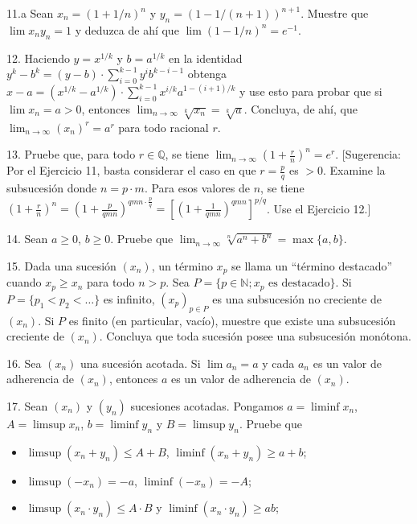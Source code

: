 \documentclass[12pt,oneside]{book}
\begin{document}
11.a Sean \( x_n = (1 + 1/n)^n \) y \( y_n = (1 - 1/(n+1))^{n+1} \). Muestre que \( \lim x_n y_n = 1 \) y deduzca de ahí que \( \lim (1 - 1/n)^n = e^{-1} \).

12. Haciendo \( y = x^{1/k} \) y \( b = a^{1/k} \) en la identidad \( y^k - b^k = (y - b) \cdot \sum_{i=0}^{k-1} y^i b^{k-i-1} \) obtenga \( x - a = (x^{1/k} - a^{1/k}) \cdot \sum_{i=0}^{k-1} x^{i/k} a^{1-(i+1)/k} \) y use esto para probar que si \( \lim x_n = a > 0 \), entonces \( \lim_{n \to \infty} \sqrt[k]{x_n} = \sqrt[k]{a} \). Concluya, de ahí, que \( \lim_{n \to \infty} (x_n)^r = a^r \) para todo racional \( r \).

13. Pruebe que, para todo \( r \in \mathbb{Q} \), se tiene \( \lim_{n \to \infty} \left( 1 + \frac{r}{n} \right)^n = e^r \). [Sugerencia: Por el Ejercicio 11, basta considerar el caso en que \( r = \frac{p}{q} \) es \( > 0 \). Examine la subsucesión donde \(n = p \cdot m\). Para esos valores de \(n\), se tiene \(\left(1 + \frac{r}{n}\right)^n = \left(1 + \frac{p}{qmn}\right)^{qmn \cdot \frac{p}{q}} = \left[\left(1 + \frac{1}{qmn}\right)^{qmn}\right]^{p/q}\). Use el Ejercicio 12.]

14. Sean \(a \ge 0\), \(b \ge 0\). Pruebe que \(\lim_{n\to\infty} \sqrt[n]{a^n + b^n} = \max\{a, b\}\).

15. Dada una sucesión \((x_n)\), un término \(x_p\) se llama un “término destacado” cuando \(x_p \ge x_n\) para todo \(n > p\). Sea \(P = \{p \in \mathbb{N}; x_p \text{ es destacado}\}\). Si \(P = \{p_1 < p_2 < \dots\}\) es infinito, \((x_p)_{p\in P}\) es una subsucesión no creciente de \((x_n)\). Si \(P\) es finito (en particular, vacío), muestre que existe una subsucesión creciente de \((x_n)\). Concluya que toda sucesión posee una subsucesión monótona.

16. Sea \((x_n)\) una sucesión acotada. Si \(\lim a_n = a\) y cada \(a_n\) es un valor de adherencia de \((x_n)\), entonces \(a\) es un valor de adherencia de \((x_n)\).

17. Sean \((x_n)\) y \((y_n)\) sucesiones acotadas. Pongamos  
\(a = \liminf x_n\), \(A = \limsup x_n\), \(b = \liminf y_n\) y \(B = \limsup y_n\). Pruebe que  
\begin{itemize}
    \item[a)] \(\limsup(x_n + y_n) \le A + B\), \(\liminf(x_n + y_n) \ge a + b\);\\
    \item[b)] \(\limsup(-x_n) = -a\), \(\liminf(-x_n) = -A\);\\
    \item[c)] \(\limsup(x_n \cdot y_n) \le A \cdot B\) y \(\liminf(x_n \cdot y_n) \ge a b\);  
\end{itemize}
\end{document}
